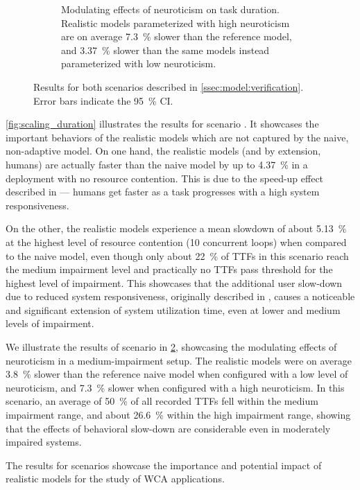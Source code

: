 \begin{figure}
\begin{subfigure}[t]{\columnwidth}
        \caption{%
            Modulating effects of neuroticism on task duration.
            Realistic models parameterized with high neuroticism are on average \SI{7.3}{\percent} slower than the reference model, and \SI{3.37}{\percent} slower than the same models instead parameterized with low neuroticism.
        }\label{fig:neuro_duration}
    \end{subfigure}%
    \caption{Results for both scenarios described in \cref{ssec:model:verification}. Error bars indicate the \SI{95}{\percent} \gls{CI}.}
\end{figure}

\cref{fig:scaling_duration} illustrates the results for scenario .
It showcases the important behaviors of the realistic models which are not captured by the naive, non-adaptive model.
On one hand, the realistic models (and by extension, humans) are actually faster than the naive model by up to \SI{4.37}{\percent} in a deployment with no resource contention.
This is due to the speed-up effect described in \textcite{olguinmunoz:impact2021} --- humans get faster as a task progresses with a high system responsiveness.

On the other, the realistic models experience a mean slowdown of about \SI{5.13}{\percent} at the highest level of resource contention (\num{10} concurrent loops) when compared to the naive model, even though only about \SI{22}{\percent} of \glspl{TTF} in this scenario reach the medium impairment level and practically no \glspl{TTF} pass threshold for the highest level of impairment.
This showcases that the additional user slow-down due to reduced system responsiveness, originally described in \textcite{olguinmunoz:impact2021}, causes a noticeable and significant extension of system utilization time, even at lower and medium levels of impairment.

\medskip

We illustrate the results of scenario  in \cref{fig:neuro_duration}, showcasing the modulating effects of neuroticism in a medium-impairment setup.
The realistic models were on average \SI{3.8}{\percent} slower than the reference naive model when configured with a low level of neuroticism, and \SI{7.3}{\percent} slower when configured with a high neuroticism.
In this scenario, an average of \SI{50}{\percent} of all recorded \glspl{TTF} fell within the medium impairment range, and about \SI{26.6}{\percent} within the high impairment range, showing that the effects of behavioral slow-down are considerable even in moderately impaired systems.

\medskip

The results for scenarios  showcase the importance and potential impact of realistic models for the study of \gls{WCA} applications.

